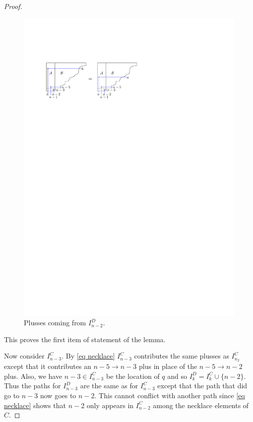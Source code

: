 \documentclass[11pt]{article}
\theoremstyle{remark}
\theoremstyle{definition}
\begin{document}
\begin{proof}
  \begin{figure}
     \includegraphics{messyD}
    \caption{Plusses coming from $I_{n-2}^{D}$.}\label{fig messyD}
  \end{figure}

  This proves the first item of statement of the lemma.

  Now consider $I_{n-3}^{C}$.  By \eqref{eq necklace} $I_{n-3}^{C}$ contributes the same plusses as $I_{n_2}^{C}$ except that it contributes an $n-5\rightarrow n-3$ plus in place of the $n-5\rightarrow n-2$ plus.  Also, we have $n-3\in I_{n-3}^{C}$ be the location of $q$ and so $I_{k}^{D} = I_k^{C}\cup\{n-2\}$.  Thus the paths for $I^{D}_{n-3}$ are the same as for $I^{C}_{n-3}$ except that the path that did go to $n-3$ now goes to $n-2$.  This cannot conflict with another path since \eqref{eq necklace} shows that $n-2$ only appears in $I_{n-2}^{C}$ among the necklace elements of $C$.


\end{proof}
\end{document}
